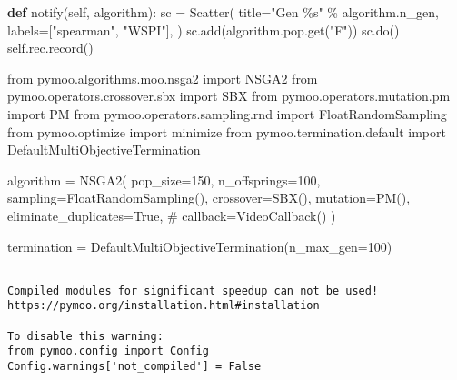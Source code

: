 \documentclass[
  letterpaper,
  DIV=11,
  numbers=noendperiod]{scrartcl}
\newenvironment{Shaded}{\begin{snugshade}}{\end{snugshade}}
\newcommand{\CommentTok}[1]{\textcolor[rgb]{0.37,0.37,0.37}{#1}}
\newcommand{\DecValTok}[1]{\textcolor[rgb]{0.68,0.00,0.00}{#1}}
\newcommand{\ImportTok}[1]{\textcolor[rgb]{0.00,0.46,0.62}{#1}}
\newcommand{\KeywordTok}[1]{\textcolor[rgb]{0.00,0.23,0.31}{\textbf{#1}}}
\newcommand{\NormalTok}[1]{\textcolor[rgb]{0.00,0.23,0.31}{#1}}
\newcommand{\OperatorTok}[1]{\textcolor[rgb]{0.37,0.37,0.37}{#1}}
\newcommand{\SpecialCharTok}[1]{\textcolor[rgb]{0.37,0.37,0.37}{#1}}
\newcommand{\StringTok}[1]{\textcolor[rgb]{0.13,0.47,0.30}{#1}}
\newcommand{\VariableTok}[1]{\textcolor[rgb]{0.07,0.07,0.07}{#1}}
\begin{document}
\begin{Shaded}
\begin{Highlighting}[]
    \KeywordTok{def}\NormalTok{ notify(}\VariableTok{self}\NormalTok{, algorithm):}
\NormalTok{        sc }\OperatorTok{=}\NormalTok{ Scatter(}
\NormalTok{            title}\OperatorTok{=}\StringTok{"Gen }\SpecialCharTok{\%s}\StringTok{"} \OperatorTok{\%}\NormalTok{ algorithm.n\_gen,}
\NormalTok{            labels}\OperatorTok{=}\NormalTok{[}\StringTok{"spearman"}\NormalTok{, }\StringTok{"WSPI"}\NormalTok{],}
\NormalTok{        )}
\NormalTok{        sc.add(algorithm.pop.get(}\StringTok{"F"}\NormalTok{))}
\NormalTok{        sc.do()}
        \VariableTok{self}\NormalTok{.rec.record()}
\end{Highlighting}
\end{Shaded}

\begin{Shaded}
\begin{Highlighting}[]
\ImportTok{from}\NormalTok{ pymoo.algorithms.moo.nsga2 }\ImportTok{import}\NormalTok{ NSGA2}
\ImportTok{from}\NormalTok{ pymoo.operators.crossover.sbx }\ImportTok{import}\NormalTok{ SBX}
\ImportTok{from}\NormalTok{ pymoo.operators.mutation.pm }\ImportTok{import}\NormalTok{ PM}
\ImportTok{from}\NormalTok{ pymoo.operators.sampling.rnd }\ImportTok{import}\NormalTok{ FloatRandomSampling}
\ImportTok{from}\NormalTok{ pymoo.optimize }\ImportTok{import}\NormalTok{ minimize}
\ImportTok{from}\NormalTok{ pymoo.termination.default }\ImportTok{import}\NormalTok{ DefaultMultiObjectiveTermination}

\NormalTok{algorithm }\OperatorTok{=}\NormalTok{ NSGA2(}
\NormalTok{    pop\_size}\OperatorTok{=}\DecValTok{150}\NormalTok{,}
\NormalTok{    n\_offsprings}\OperatorTok{=}\DecValTok{100}\NormalTok{,}
\NormalTok{    sampling}\OperatorTok{=}\NormalTok{FloatRandomSampling(),}
\NormalTok{    crossover}\OperatorTok{=}\NormalTok{SBX(),}
\NormalTok{    mutation}\OperatorTok{=}\NormalTok{PM(),}
\NormalTok{    eliminate\_duplicates}\OperatorTok{=}\VariableTok{True}\NormalTok{,}
    \CommentTok{\# callback=VideoCallback()}
\NormalTok{)}

\NormalTok{termination }\OperatorTok{=}\NormalTok{ DefaultMultiObjectiveTermination(n\_max\_gen}\OperatorTok{=}\DecValTok{100}\NormalTok{)}
\end{Highlighting}
\end{Shaded}

\begin{verbatim}

Compiled modules for significant speedup can not be used!
https://pymoo.org/installation.html#installation

To disable this warning:
from pymoo.config import Config
Config.warnings['not_compiled'] = False
\end{verbatim}
\end{document}
